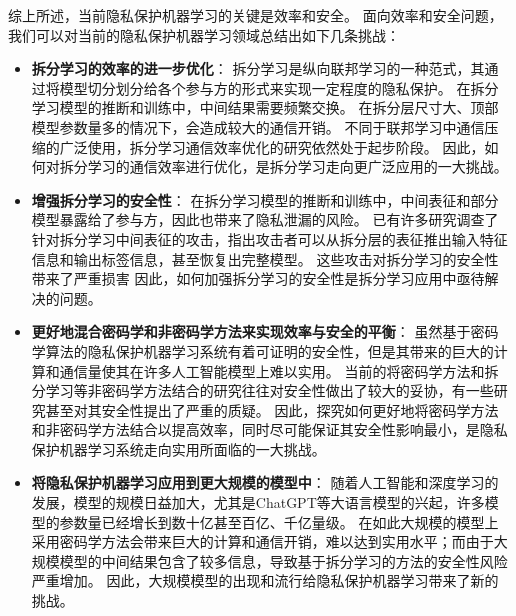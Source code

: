 综上所述，当前隐私保护机器学习的关键是效率和安全。
面向效率和安全问题，我们可以对当前的隐私保护机器学习领域总结出如下几条挑战：
\begin{itemize}
    \item \textbf{拆分学习的效率的进一步优化}：
    拆分学习是纵向联邦学习的一种范式，其通过将模型切分划分给各个参与方的形式来实现一定程度的隐私保护。
    在拆分学习模型的推断和训练中，中间结果需要频繁交换。
    在拆分层尺寸大、顶部模型参数量多的情况下，会造成较大的通信开销。
    不同于联邦学习中通信压缩的广泛使用，拆分学习通信效率优化的研究依然处于起步阶段。
    因此，如何对拆分学习的通信效率进行优化，是拆分学习走向更广泛应用的一大挑战。

    \item \textbf{增强拆分学习的安全性}：
    在拆分学习模型的推断和训练中，中间表征和部分模型暴露给了参与方，因此也带来了隐私泄漏的风险。
    已有许多研究调查了针对拆分学习中间表征的攻击，指出攻击者可以从拆分层的表征推出输入特征信息和输出标签信息，甚至恢复出完整模型。
    这些攻击对拆分学习的安全性带来了严重损害
    因此，如何加强拆分学习的安全性是拆分学习应用中亟待解决的问题。

    \item \textbf{更好地混合密码学和非密码学方法来实现效率与安全的平衡}：
    虽然基于密码学算法的隐私保护机器学习系统有着可证明的安全性，但是其带来的巨大的计算和通信量使其在许多人工智能模型上难以实用。
    当前的将密码学方法和拆分学习等非密码学方法结合的研究往往对安全性做出了较大的妥协，有一些研究甚至对其安全性提出了严重的质疑。
    因此，探究如何更好地将密码学方法和非密码学方法结合以提高效率，同时尽可能保证其安全性影响最小，是隐私保护机器学习系统走向实用所面临的一大挑战。

    \item \textbf{将隐私保护机器学习应用到更大规模的模型中}：
    随着人工智能和深度学习的发展，模型的规模日益加大，尤其是ChatGPT等大语言模型的兴起，许多模型的参数量已经增长到数十亿甚至百亿、千亿量级。
    在如此大规模的模型上采用密码学方法会带来巨大的计算和通信开销，难以达到实用水平；而由于大规模模型的中间结果包含了较多信息，导致基于拆分学习的方法的安全性风险严重增加。
    因此，大规模模型的出现和流行给隐私保护机器学习带来了新的挑战。
\end{itemize}



